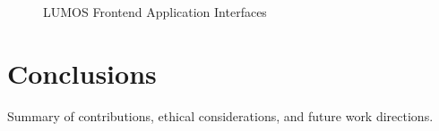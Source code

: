 \documentclass[12pt,a4paper,oneside,openany]{report}
\begin{document}
\begin{figure}[H]
\caption{LUMOS Frontend Application Interfaces}
\label{fig:frontend-screens}
\end{figure}

\chapter{Conclusions}
\label{ch:conclusions}

Summary of contributions, ethical considerations, and future work directions.

\end{document}
